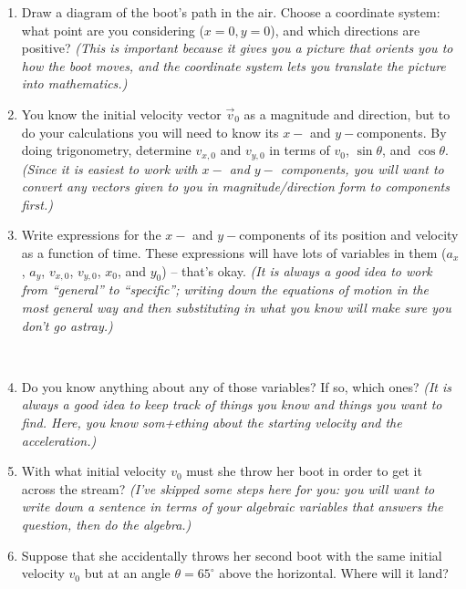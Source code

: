 \documentclass[12pt]{article}
\begin{document}
\begin{enumerate}

\item Draw a diagram of the boot's path in the air. Choose a coordinate system: what point are you considering ($x=0, y=0$), and which directions are positive? {\it (This is important because it gives you a picture that orients you to how the boot moves, and the coordinate system lets you translate the picture into mathematics.)}

\vspace{2in}
\item You know the initial velocity vector $\vec v_0$ as a magnitude and direction, but to do your calculations you will need to know its $x-$ and $y-$components. By doing trigonometry,
determine $v_{x,0}$ and $v_{y,0}$ in terms of $v_0$, $\sin \theta$, and $\cos \theta$. {\it (Since it is easiest to work with $x-$ and $y-$ components, you will want to convert any vectors given to you in magnitude/direction form to components first.)}

\vspace{2in}
\newpage

\item Write expressions for the $x-$ and $y-$components of its position and velocity as a function of time. These expressions will have lots of variables in them ($a_x$, $a_y$, $v_{x,0}$, $v_{y,0}$, $x_0$, and $y_0$) -- that's okay. {\it (It is always a good idea to work from ``general'' to ``specific''; writing down the equations of motion in the most general way and then substituting in what you know will make sure you don't go astray.)}

\vspace{3in}
\

\item Do you know anything about any of those variables? If so, which ones? {\it (It is always a good idea to keep track of things you know and things you want to find. Here, you know som+ething about the starting velocity and the acceleration.)}

\vspace{1in}

\item With what initial velocity $v_0$ must she throw her boot in order to get it across the stream? {\it (I've skipped some steps here for you: you will want to write down a sentence in terms of your algebraic variables that answers the question, then do the algebra.)}

\vspace{3in}

\item Suppose that she accidentally throws her second boot with the same initial velocity $v_0$ but at an angle $\theta = 65^\circ$ above the horizontal. Where will it land?

\vspace{2in}

\end{enumerate}
\end{document}
